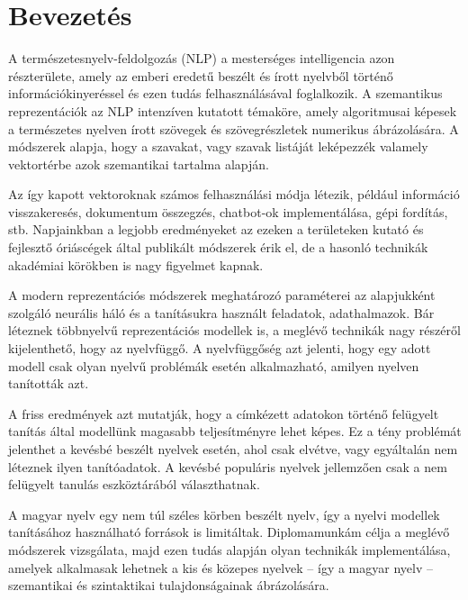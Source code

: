 \chapter{Bevezetés} %
\label{ch:intro}

A természetesnyelv-feldolgozás (NLP) a mesterséges intelligencia azon részterülete, amely az emberi eredetű beszélt és írott nyelvből történő információkinyeréssel és ezen tudás felhasználásával foglalkozik. A szemantikus reprezentációk az NLP intenzíven kutatott témaköre, amely algoritmusai képesek a természetes nyelven írott szövegek és szövegrészletek numerikus ábrázolására. A módszerek alapja, hogy a szavakat, vagy szavak listáját leképezzék valamely vektortérbe azok szemantikai tartalma alapján. 

Az így kapott vektoroknak számos felhasználási módja létezik, például információ visszakeresés, dokumentum összegzés, chatbot-ok implementálása, gépi fordítás, stb. Napjainkban a legjobb eredményeket az ezeken a területeken kutató és fejlesztő óriáscégek által publikált módszerek érik el, de a hasonló technikák akadémiai körökben is nagy figyelmet kapnak.

A modern reprezentációs módszerek meghatározó paraméterei az alapjukként szolgáló neurális háló és a tanításukra használt feladatok, adathalmazok.
Bár léteznek többnyelvű reprezentációs modellek is, a meglévő technikák nagy részéről kijelenthető, hogy az nyelvfüggő. A nyelvfüggőség azt jelenti, hogy egy adott modell csak olyan nyelvű problémák esetén alkalmazható, amilyen nyelven tanították azt.

A friss eredmények azt mutatják, hogy a címkézett adatokon történő felügyelt tanítás által modellünk magasabb teljesítményre lehet képes. Ez a tény problémát jelenthet a kevésbé beszélt nyelvek esetén, ahol csak elvétve, vagy egyáltalán nem léteznek ilyen tanítóadatok. A kevésbé populáris nyelvek jellemzően csak a nem felügyelt tanulás eszköztárából választhatnak.

A magyar nyelv egy nem túl széles körben beszélt nyelv, így a nyelvi modellek tanításához használható források is limitáltak. Diplomamunkám célja a meglévő módszerek vizsgálata, majd ezen tudás alapján olyan technikák implementálása, amelyek alkalmasak lehetnek a kis és közepes nyelvek – így a magyar nyelv – szemantikai és szintaktikai tulajdonságainak ábrázolására. 
